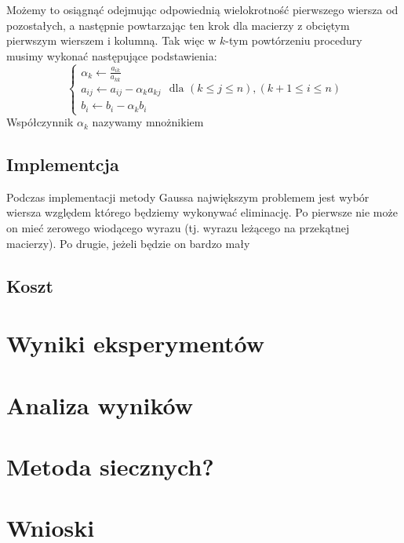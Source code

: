 \documentclass[11pt,wide]{mwart}
\begin{document}
Możemy to osiągnąć odejmując odpowiednią wielokrotność pierwszego wiersza od pozostałych, a następnie powtarzając ten krok dla macierzy z obciętym pierwszym wierszem i kolumną. Tak więc w $ k $-tym powtórzeniu procedury musimy wykonać następujące podstawienia:
\begin{equation}
\begin{cases}
	\alpha_k \leftarrow \frac{a_{ik}}{a_{kk}} \\
	a_{ij} \leftarrow a_{ij} - \alpha_k a_{kj} \\
	b_{i} \leftarrow b_{i} - \alpha_k b_{i}
\end{cases} \text{ dla }(k \leq j \leq n), (k + 1 \leq i \leq n)
\end{equation}
Współczynnik $ \alpha_k $ nazywamy mnożnikiem
\subsection*{Implementcja}
Podczas implementacji metody Gaussa największym problemem jest wybór wiersza względem którego będziemy wykonywać eliminację. Po pierwsze nie może on mieć zerowego wiodącego wyrazu (tj. wyrazu leżącego na przekątnej macierzy). Po drugie, jeżeli będzie on bardzo mały
\subsection*{Koszt} \label{SS:gausscost}
\section{Wyniki eksperymentów}
\section{Analiza wyników}
\section{Metoda siecznych?}
\section{Wnioski}
\end{document}
